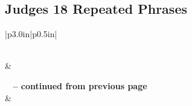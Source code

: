 \subsection{Judges 18 Repeated Phrases}


\normalsize
 
\begin{center}
\begin{longtable}{|p{3.0in}|p{0.5in}|}
\caption[Judges 18 Repeated Phrases]{Judges 18 Repeated Phrases}\label{table:Repeated Phrases Judges 18} \\
\hline {} &  \\ \hline 
\endfirsthead
 
{{\bfseries \tablename\ \thetable{} -- continued from previous page}} \\  
\hline {} &  \\ \hline 
\endhead
 

\end{longtable}
\end{center}
